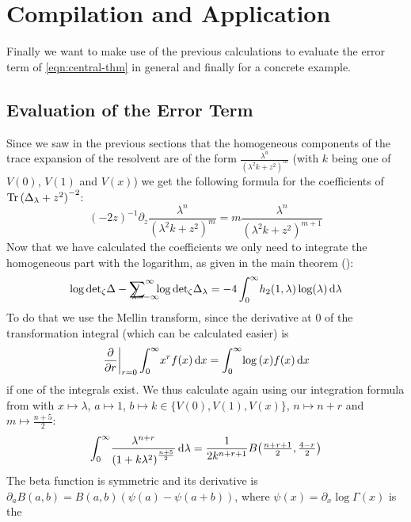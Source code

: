 \section{Compilation and Application}
Finally we want to make use of the previous calculations to evaluate the error
term of \cref{eqn:central-thm} in general and finally for a concrete example.

\subsection{Evaluation of the Error Term}
Since we saw in the previous sections that the homogeneous components of the
trace expansion of the resolvent are of the form $\frac{\lambda^n}{(\lambda^2 k
+ z^2)^m}$ (with $k$ being one of $V(0)$, $V(1)$ and $V(x)$) we get the
following formula for the coefficients of $\Tr{(\Delta_\lambda + z^2)}^{-2}$:
\begin{equation}
  (-2z)^{-1} \partial_z \frac{\lambda^n}{(\lambda^2 k + z^2)^{m}}
    = m \frac{\lambda^n}{(\lambda^2 k + z^2)^{m+1}}
\end{equation}
Now that we have calculated the coefficients we only need to integrate the
homogeneous part with the logarithm, as given in the main theorem (\cite[Thm
1.4]{LV13}):
\begin{equation*}
  \log\zdet\Delta - \Regsum_{\mathclap{\lambda=-\infty}}^\infty
  \log\zdet\Delta_\lambda = -4
  \Integ[\infty]{0}{\lambda}{h_2(1,\lambda)\log(\lambda)}
\end{equation*}
To do that we use the Mellin transform, since the derivative at $0$ of the
transformation integral (which can be calculated easier) is
\begin{equation*}
    \left.\frac\partial{\partial r}\right|_{r=0}\Integ[\infty]{0}{x}{x^r f(x)}
    = \Integ[\infty]{0}{x}{\log{(x)} f(x)}
\end{equation*}
if one of the integrals exist. We thus calculate again using our integration
formula from  with $x\mapsto \lambda$, $a
\mapsto 1$, $b \mapsto k \in\{V(0), V(1), V(x)\}$, $n \mapsto n + r$ and $m
\mapsto \tfrac{n+5}{2}$:
\begin{equation*}
    \Integ[\infty]{0}{\lambda}{\frac{\lambda^{n + r}}{\left(1 +
    k\lambda^2\right)^{\frac{n+5}{2}}}} =
      \frac{1}{2k^{n+r+1}} B\bigl(\tfrac{n+r+1}{2}, \tfrac{4-r}{2}\bigr)
\end{equation*}
The beta function is symmetric and its derivative is $\partial_a B(a,b) =
B(a,b) (\psi(a) - \psi(a+b))$, where $\psi(x) = \partial_x \log\Gamma(x)$ is the

